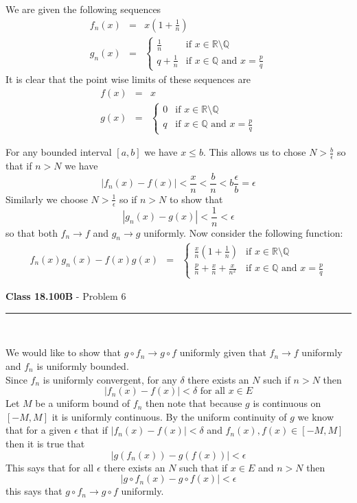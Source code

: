 \documentclass[11pt,reqno]{article}
\begin{document}
We are given the following sequences 
\begin{eqnarray*}
 f_n(x) &=& x(1 + \frac{1}{n}) \\
 g_n(x) &=& \left\{
	\begin{array}{ll}
		\frac{1}{n}  & \mbox{if } x \in \mathbb{R} \text{\textbackslash} \mathbb{Q} \\
		q + \frac{1}{n} & \mbox{if } x \in \mathbb{Q} \text{ and } x = \frac{p}{q}
	\end{array}
\right.
\end{eqnarray*}
It is clear that the point wise limits of these sequences are 
\begin{eqnarray*}
 f(x) &=& x\\
 g(x) &=& \left\{
	\begin{array}{ll}
		0 & \mbox{if } x \in \mathbb{R} \text{\textbackslash} \mathbb{Q} \\
		q & \mbox{if } x \in \mathbb{Q} \text{ and } x = \frac{p}{q}
	\end{array}
\right.
\end{eqnarray*}

For any bounded interval $[a,b]$ we have $x \le b$. This allows us to chose $N > \frac{b}{\epsilon}$ so that if $n > N$ we have
\[ |f_n(x) - f(x) | < \frac{x}{n} < \frac{b}{n}  < b \frac{\epsilon}{b} = \epsilon \]
Similarly we choose $N > \frac{1}{\epsilon}$ so if  $n > N$ to show that 
\[ |g_n(x) - g(x)| < \frac{1}{n} < \epsilon \]
so that both $f_n \to f$ and $g_n \to g$ uniformly.
Now consider the following function:
\begin{eqnarray*}
f_n(x)g_n(x) - f(x)g(x) &=& \left\{
	\begin{array}{ll}
		\frac{x}{n}(1 + \frac{1}{n}) & \mbox{if } x \in \mathbb{R} \text{\textbackslash} \mathbb{Q} \\
		 \frac{p}{n} + \frac{x}{n} + \frac{x}{n^2}& \mbox{if } x \in \mathbb{Q} \text{ and } x = \frac{p}{q}
	\end{array}
\right.
\end{eqnarray*}

\vspace{15pt}
\begin{flushleft} 
\textbf{Class 18.100B} - Problem 6\\
\rule{500pt}{1pt}\\
\end{flushleft} 

We would like to show that $g \circ f_n \to g \circ f$ uniformly given that $f_n \to f$ uniformly and $f_n$ is uniformly bounded.\\
Since $f_n$ is uniformly convergent, for any $\delta$ there exists an $N$ such if $n > N$ then 
\[  |f_n(x) - f(x)| < \delta \text{ for all $x \in E$} \]
Let $M$ be a uniform bound of $f_n$ then note that because $g$ is continuous on $[-M,M]$ it is uniformly continuous. By the uniform continuity of $g$ we know that for a given $\epsilon$ that if $|f_n(x) - f(x)| < \delta $ and $f_n(x),f(x) \in [-M,M]$ then it is true that 
\[ |g(f_n(x)) - g(f(x))| < \epsilon \]
This says that for all $\epsilon$ there exists an $N$ such that if $x \in E$ and $n > N$ then 
\[ |g \circ f_n(x) - g \circ f(x)| < \epsilon \]
this says that $g \circ f_n \to g \circ f$ uniformly.
\end{document}
